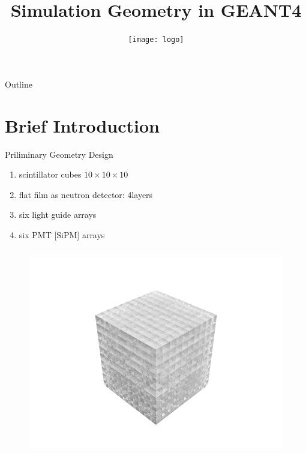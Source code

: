 \documentclass[11pt,compress,xcolor=x11names,UTF8]{beamer}
\title{Simulation Geometry in GEANT4}
\author[Rong Zhao]{Email：zhaor25@mail2.sysu.edu.cn \and  } %
\institute[SYSU]{School of Physics\and } %
\date[\today]{\texttt{[image: logo]}}
\begin{document}
\maketitle

\begin{frame}{Outline}
\tableofcontents
\end{frame}

\section{Brief Introduction}


\begin{frame}{Priliminary Geometry Design}
\begin{enumerate}
\item scintillator cubes $10\times 10 \times 10$
\item flat film as neutron detector: 4layers
\item six light guide arrays
\item six PMT [SiPM] arrays
\end{enumerate}
\vspace{-1cm}
\begin{columns}
\begin{column}{.33\textwidth}
\begin{figure}
\centering
\includegraphics[width=1.3\textwidth]{currentfig/geo1.png} %

\end{figure}
\end{column}
\end{columns}
\end{frame}
\end{document}
